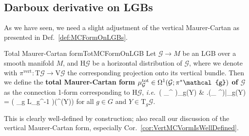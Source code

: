 \documentclass[a4paper,oneside,11pt,bibliography=totoc]{scrartcl}
\def\bas#1\eas{\begin{align*}#1\end{align*}}
\theoremstyle{plain}
\theoremstyle{remark}
\theoremstyle{definition}
\begin{document}
\subsection{Darboux derivative on LGBs}

As we have seen, we need a slight adjustment of the vertical Maurer-Cartan as presented in Def.\ \ref{def:MCFormOnLGBs}.

\begin{definitions}{Total Maurer-Cartan form}{TotMCFormOnLGB}
Let $\mathcal{G} \to M$ be an LGB over a smooth manifold $M$, and $\mathrm{H}\mathcal{G}$ be a horizontal distribution of $\mathcal{G}$, where we denote with $\pi^{\mathrm{vert}}: \mathrm{T}\mathcal{G} \to \mathrm{V}\mathcal{G}$ the corresponding projection onto its vertical bundle. Then we define the \textbf{total Maurer-Cartan form $\mu_{\mathcal{G}}^{\mathrm{tot}} \in \Omega^1\mleft(\mathcal{G}; \pi^*\mathcal{g}\mright)$ of $\mathcal{G}$} as the connection 1-form corresponding to $\mathrm{H}\mathcal{G}$, \textit{i.e.}\
\bas
\mleft( \mu_{\mathcal{G}}^{\mathrm{tot}} \mright)_g(Y)
&\coloneqq
\mleft.\mleft(\mu_\mathcal{G} \circ \pi^{\mathrm{vert}}\mright)\mright|_g(Y)
=
\mleft( \mathrm{D}_g L_{g^{-1}} \mright)\mleft(\pi^{\mathrm{vert}}(Y)\mright)
\eas
for all $g \in G$ and $Y \in \mathrm{T}_g$.
\end{definitions}

This is clearly well-defined by construction; also recall our discussion of the vertical Maurer-Cartan form, especially Cor.\ \ref{cor:VertMCVormIsWellDefined}.
\end{document}
